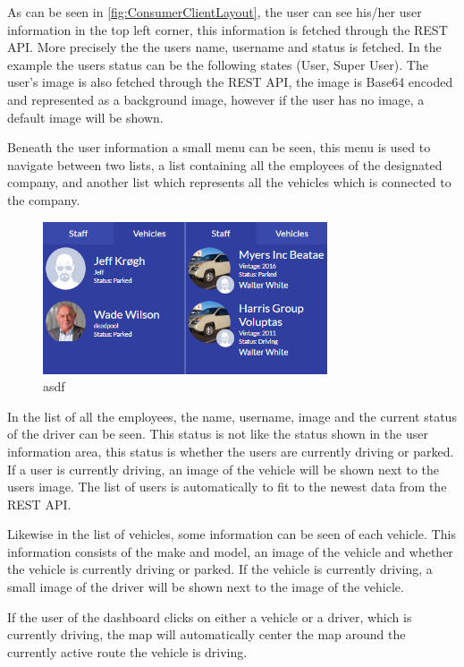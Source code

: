 As can be seen in \cref{fig:ConsumerClientLayout}, the user can see his/her user information in the top left corner, this information is fetched through the REST API.
More precisely the the users name, username and status is fetched.
In the example the users status can be the following states (User, Super User).
The user's image is also fetched through the REST API, the image is Base64 encoded and represented as a background image, however if the user has no image, a default image will be shown.

\bigskip
Beneath the user information a small menu can be seen, this menu is used to navigate between two lists, a list containing all the employees of the designated company, and another list which represents all the vehicles which is connected to the company.

\begin{figure}[h]
    \centering
    \includegraphics[width=0.75\textwidth]{img/displayOfMenuesInConsumerClient.png}
    \caption{asdf}
    \label{fig:ConsumerClientMenus}
\end{figure}

In the list of all the employees, the name, username, image and the current status of the driver can be seen.
This status is not like the status shown in the user information area, this status is whether the users are currently driving or parked.
If a user is currently driving, an image of the vehicle will be shown next to the users image.
The list of users is automatically to fit to the newest data from the REST API.

Likewise in the list of vehicles, some information can be seen of each vehicle.
This information consists of the make and model, an image of the vehicle and whether the vehicle is currently driving or parked.
If the vehicle is currently driving, a small image of the driver will be shown next to the image of the vehicle.

If the user of the dashboard clicks on either a vehicle or a driver, which is currently driving, the map will automatically center the map around the currently active route the vehicle is driving.


